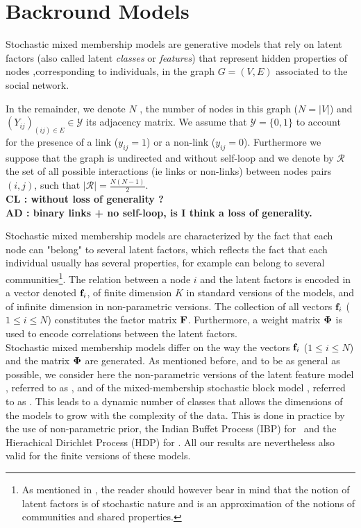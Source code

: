 
\section{Backround Models}
\label{sec:background}

Stochastic mixed membership models are generative models that rely on latent factors (also called latent \textit{classes} or \textit{features}) that represent hidden properties of nodes ,corresponding to individuals, in the graph $G=(V,E)$ associated to the social network.

In the remainder, we denote $N$ , the number of nodes in this graph ($N = |V|$) and $(Y_{ij})_{(ij) \in E} \in \mathcal{Y}$ its adjacency matrix.  We assume that $\mathcal{Y} = \{0,1\}$ to account for the presence of a link ($y_{ij}=1$) or a non-link ($y_{ij}=0$). Furthermore we suppose that the graph is undirected and without self-loop and we denote by $\mathcal{R}$ the set of all possible interactions (ie links or non-links) between nodes pairs $(i,j)$, such that $|\mathcal{R}| = \frac{N(N-1)}{2}$. \\
\textbf{ CL : without loss of generality ?}\\
\textbf{ AD : binary links + no self-loop, is I think a loss of generality.}

Stochastic mixed membership models are characterized by the fact that each node can "belong" to several latent factors, which reflects the fact that each individual usually has several properties, for example can belong to several communities\footnote{As mentioned in \cite{goldenberg2010survey}, the reader should however bear in mind that the notion of latent factors is of stochastic nature and is an approximation of the notions of communities and shared properties.}. The relation between a node $i$ and the latent factors is encoded in a vector denoted $\mathbf{f}_{i}$, of finite dimension $K$ in standard versions of the models, and of infinite dimension in  non-parametric versions. The collection of all vectors $\mathbf{f}_{i}$ ($1 \le i \le N$) constitutes the factor matrix $\mathbf{F}$. Furthermore, a weight matrix $\mathbf{\Phi}$ is used to encode correlations between the latent factors.~\\

Stochastic mixed membership models differ on the way the vectors $\mathbf{f}_{i}$ ($1 \le i \le N$) and the matrix $\mathbf{\Phi}$ are generated. As mentioned before, and to be as general as possible, we consider here the non-parametric versions of the latent feature model \cite{ILFRM}, referred to as \ifm, and of the mixed-membership stochastic block model \cite{iMMSB,fan2015dynamic}, referred to as \imb. This leads to a dynamic number of classes that allows the dimensions of the models to grow with the complexity of the data. This is done in practice by the use of non-parametric prior,  the Indian Buffet Process (IBP) for \ifm\ and the Hierachical Dirichlet Process (HDP)  for \imb. All our results are nevertheless also valid for the finite versions of these models.~\\

